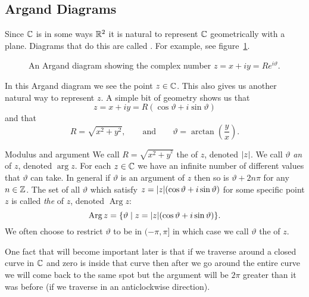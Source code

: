 \documentclass{article}
\DeclareMathOperator{\Arg}{Arg}
\newcommand{\st}{\mid}
\begin{document}
    \subsection{Argand Diagrams}
    Since \(\mathbb{C}\) is in some ways \(\mathbb{R}^2\) it is natural to represent \(\mathbb{C}\) geometrically with a plane.
    Diagrams that do this are called .
    For example, see figure~\ref{fig:Argand diagram}.
    \begin{figure}[ht]
        \centering
        \caption{An Argand diagram showing the complex number \(z = x + iy = Re^{i\vartheta}\).}
        \label{fig:Argand diagram}
    \end{figure}
    In this Argand diagram we see the point \(z\in\mathbb{C}\).
    This also gives us another natural way to represent \(z\).
    A simple bit of geometry shows us that
    \[z = x + iy = R(\cos\vartheta + i\sin\vartheta)\]
    and that
    \[R = \sqrt{x^2 + y^2}, \qquad\text{and}\qquad \vartheta = \arctan\left(\frac{y}{x}\right).\]
    \begin{definition}{Modulus and argument}{}
        We call \(R = \sqrt{x^2 + y^^2}\) the  of \(z\), denoted \(\abs{z}\).
        We call \(\vartheta\) \emph{an}  of \(z\), denoted \(\arg z\).
        For each \(z\in\mathbb{C}\) we have an infinite number of different values that \(\vartheta\) can take.
        In general if \(\vartheta\) is an argument of \(z\) then so is \(\vartheta + 2n\pi\) for any \(n\in\mathbb{Z}\).
        The set of all \(\vartheta\) which satisfy \(z = \abs{z}(\cos\vartheta + i\sin\vartheta)\) for some specific point \(z\) is called \emph{the}  of \(z\), denoted \(\Arg z\):
        \[\Arg z = \{\vartheta \st z = \abs{z}(\cos\vartheta + i\sin\vartheta)\}.\]
        We often choose to restrict \(\vartheta\) to be in \((-\pi, \pi]\) in which case we call \(\vartheta\) the  of \(z\).
    \end{definition}
    One fact that will become important later is that if we traverse around a closed curve in \(\mathbb{C}\) and zero is inside that curve then after we go around the entire curve we will come back to the same spot but the argument will be \(2\pi\) greater than it was before (if we traverse in an anticlockwise direction).
    
\end{document}
